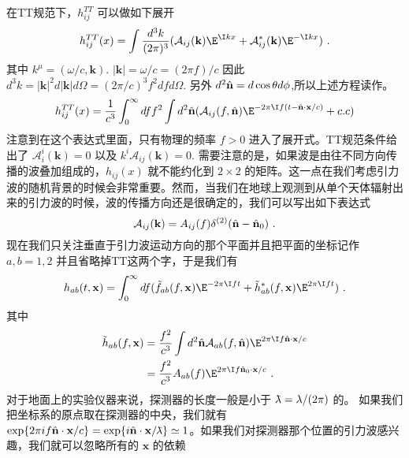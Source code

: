 在TT规范下，$h^{TT}_{ij}$ 可以做如下展开
\begin{equation}
h^{TT}_{ij}(x) = \int \frac{d^3 k}{(2\pi)^3} (\mathcal A_{ij}(\mathbf k) \E^{\I kx} + \mathcal A_{ij}^* (\mathbf k) \E^{-\I k x} ) ~. 
\end{equation}
其中 $k^\mu = (\omega/c,\mathbf k)$. $|\mathbf k| = \omega/c = (2\pi f)/c$ 因此 $d^3 k = |\mathbf k|^2 d|\mathbf k| d\Omega = (2\pi/c)^3 f^2 df d\Omega $. 另外 $d^2\hat{\bf{n}} = d\cos\theta d\phi$,所以上述方程读作。
\begin{equation}\label{eq_TTGaug_4}
h^{TT}_{ij}(x) = \frac{1}{c^3} \int^\infty_0 df f^2 \int d^2 \hat{ \bf{n} } ( \mathcal A_{ij} (f,\hat{ \bf{n} }) \E^{-2\pi \I f(t-\hat{ {\bf n} } \cdot {\bf x} /c  )}  + {c.c} ) 
\end{equation}
注意到在这个表达式里面，只有物理的频率 $f>0$ 进入了展开式。TT规范条件给出了 $\mathcal A^i_i (\mathbf k) =0 $ 以及 $k^i \mathcal A_{ij} (\mathbf k) =0 $. 需要注意的是，如果波是由往不同方向传播的波叠加组成的，$h_{ij}(x)$ 就不能约化到 $2\times 2$ 的矩阵。这一点在我们考虑引力波的随机背景的时候会非常重要。然而，当我们在地球上观测到从单个天体辐射出来的引力波的时候，波的传播方向还是很确定的，我们可以写出如下表达式
\begin{equation}
\mathcal A_{ij} (\mathbf k) = A_{ij} (f) \delta^{(2)} (\hat{  \mathbf n } - \hat{ {\bf n} }_0 )~.
\end{equation}
现在我们只关注垂直于引力波运动方向的那个平面并且把平面的坐标记作 $a,b = 1,2$ 并且省略掉TT这两个字，于是我们有
\begin{equation}
h_{ab} (t,\mathbf x ) = \int^\infty_0 df ( \tilde f_{ab} (f,\mathbf x) \E^{-2\pi \I f t} + \tilde h^*_{ab} (f,\mathbf x) \E^{2\pi \I f t} ) ~. 
\end{equation}
其中
\begin{equation}
\begin{aligned}
\tilde h_{ab} (f,\mathbf x) & = \frac{f^2}{c^3} \int d^2 \hat{  \mathbf n } \mathcal A_{ab} (f, \hat{\mathbf{n}}) \E^{2\pi \I f \hat{  \mathbf n } \cdot \mathbf x / c  } \\
& = \frac{f^2}{c^3} A_{ab} (f) \E^{2\pi \I f {\hat{\mathbf n}_0 \cdot \mathbf x /c  } }~.
\end{aligned}
\end{equation} 
对于地面上的实验仪器来说，探测器的长度一般是小于 ${\mkern0.7mu {\bar{\phantom{a}}} \mkern -11mu\lambda} = \lambda/(2\pi)$ 的。 如果我们把坐标系的原点取在探测器的中央，我们就有 $\exp  \{   2\pi i f \hat{ \mathbf n } \cdot \mathbf x/c \} = \exp \{ i \hat{ {\bf n} } \cdot \mathbf x / {\mkern0.75mu {\bar{\phantom{a}}} \mkern -11.75mu\lambda} \} \simeq 1  $。如果我们对探测器那个位置的引力波感兴趣，我们就可以忽略所有的 $\mathbf x$ 的依赖
